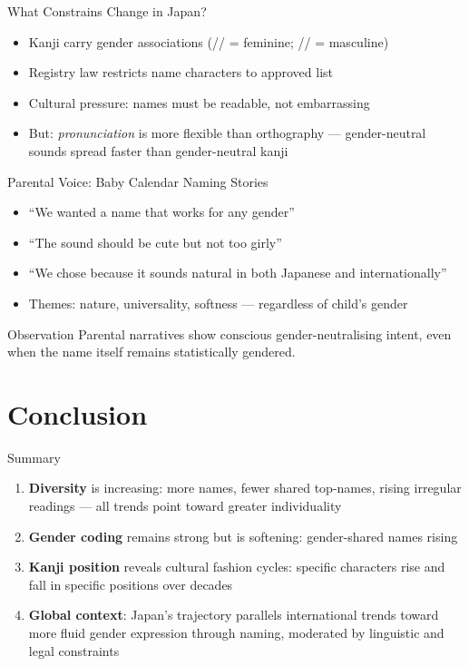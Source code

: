 \documentclass{beamer}
\begin{document}
\begin{frame}{What Constrains Change in Japan?}
  \begin{itemize}
    \item Kanji carry gender associations (// = feminine;
      // = masculine)
    \item Registry law restricts name characters to approved list
    \item Cultural pressure: names must be readable, not embarrassing
    \item But: \emph{pronunciation} is more flexible than orthography ---
      gender-neutral sounds spread faster than gender-neutral kanji
  \end{itemize}
\end{frame}

\begin{frame}{Parental Voice: Baby Calendar Naming Stories}
  \begin{itemize}
    \item ``We wanted a name that works for any gender''
    \item ``The sound should be cute but not too girly''
    \item ``We chose  because it sounds natural in both Japanese and
      internationally''
    \item Themes: nature, universality, softness --- regardless of child's gender
  \end{itemize}
  \vspace{1em}
  \begin{block}{Observation}
    Parental narratives show conscious gender-neutralising intent,
    even when the name itself remains statistically gendered.
  \end{block}
\end{frame}

\section{Conclusion}

\begin{frame}{Summary}
  \begin{enumerate}
    \item \textbf{Diversity} is increasing: more names, fewer shared top-names,
      rising irregular readings --- all trends point toward greater individuality
    \item \textbf{Gender coding} remains strong but is softening: gender-shared names rising
    \item \textbf{Kanji position} reveals cultural fashion cycles:
      specific characters rise and fall in specific positions over decades
    \item \textbf{Global context}: Japan's trajectory parallels international
      trends toward more fluid gender expression through naming,
      moderated by linguistic and legal constraints
  \end{enumerate}
\end{frame}
\end{document}
